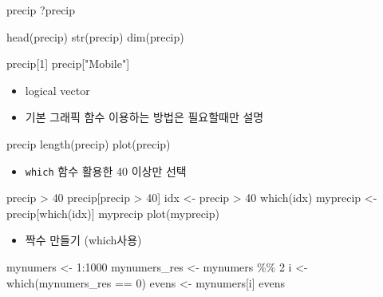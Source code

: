 \documentclass[
]{book}
\newenvironment{Shaded}{\begin{snugshade}}{\end{snugshade}}
\newcommand{\DecValTok}[1]{\textcolor[rgb]{0.00,0.00,0.81}{#1}}
\newcommand{\FunctionTok}[1]{\textcolor[rgb]{0.00,0.00,0.00}{#1}}
\newcommand{\NormalTok}[1]{#1}
\newcommand{\OtherTok}[1]{\textcolor[rgb]{0.56,0.35,0.01}{#1}}
\newcommand{\SpecialCharTok}[1]{\textcolor[rgb]{0.00,0.00,0.00}{#1}}
\newcommand{\StringTok}[1]{\textcolor[rgb]{0.31,0.60,0.02}{#1}}
\providecommand{\tightlist}{%
  \setlength{\itemsep}{0pt}\setlength{\parskip}{0pt}}
\begin{document}
\begin{Shaded}
\begin{Highlighting}[]
\NormalTok{precip}
\NormalTok{?precip}

\FunctionTok{head}\NormalTok{(precip)}
\FunctionTok{str}\NormalTok{(precip)}
\FunctionTok{dim}\NormalTok{(precip)}

\NormalTok{precip[}\DecValTok{1}\NormalTok{]}
\NormalTok{precip[}\StringTok{"Mobile"}\NormalTok{]}
\end{Highlighting}
\end{Shaded}

\begin{itemize}
\tightlist
\item
  logical vector
\item
  기본 그래픽 함수 이용하는 방법은 필요할때만 설명
\end{itemize}

\begin{Shaded}
\begin{Highlighting}[]
\NormalTok{precip}
\FunctionTok{length}\NormalTok{(precip)}
\FunctionTok{plot}\NormalTok{(precip)}
\end{Highlighting}
\end{Shaded}

\begin{itemize}
\tightlist
\item
  \texttt{which} 함수 활용한 40 이상만 선택
\end{itemize}

\begin{Shaded}
\begin{Highlighting}[]
\NormalTok{precip }\SpecialCharTok{\textgreater{}} \DecValTok{40}
\NormalTok{precip[precip }\SpecialCharTok{\textgreater{}} \DecValTok{40}\NormalTok{]}
\NormalTok{idx }\OtherTok{\textless{}{-}}\NormalTok{ precip }\SpecialCharTok{\textgreater{}} \DecValTok{40}
\FunctionTok{which}\NormalTok{(idx)}
\NormalTok{myprecip }\OtherTok{\textless{}{-}}\NormalTok{ precip[}\FunctionTok{which}\NormalTok{(idx)]}
\NormalTok{myprecip}
\FunctionTok{plot}\NormalTok{(myprecip)}
\end{Highlighting}
\end{Shaded}

\begin{itemize}
\tightlist
\item
  짝수 만들기 (which사용)
\end{itemize}

\begin{Shaded}
\begin{Highlighting}[]
\NormalTok{mynumers }\OtherTok{\textless{}{-}} \DecValTok{1}\SpecialCharTok{:}\DecValTok{1000}
\NormalTok{mynumers\_res }\OtherTok{\textless{}{-}}\NormalTok{ mynumers }\SpecialCharTok{\%\%} \DecValTok{2}
\NormalTok{i }\OtherTok{\textless{}{-}} \FunctionTok{which}\NormalTok{(mynumers\_res }\SpecialCharTok{==} \DecValTok{0}\NormalTok{)}
\NormalTok{evens }\OtherTok{\textless{}{-}}\NormalTok{ mynumers[i]}
\NormalTok{evens}
\end{Highlighting}
\end{Shaded}
\end{document}
